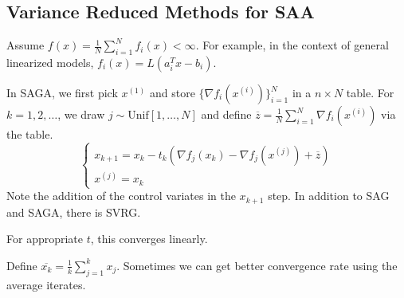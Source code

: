 \subsection{Variance Reduced Methods for SAA}
Assume $f(x) = \frac{1}{N} \sum_{i=1}^N f_i(x) < \infty$. For example, in the context of general linearized models, $f_i(x) = L(a_i^T x - b_i)$.

In SAGA, we first pick $x^{(1)}$ and store $\{ \nabla f_i(x^{(i)} ) \}_{i=1}^N$ in a $n \times N$ table. For $k=1,2,\dots$, we draw $j \sim \text{Unif}[1,\dots,N]$ and define $\overline{z} = \frac{1}{N} \sum_{i=1}^N \nabla f_i(x^{(i)})$ via the table.
\[
\begin{cases}
x_{k+1} = x_k - t_k (\nabla f_j(x_k) - \nabla f_j(x^{(j)}) + \overline{z} ) \\
x^{(j)} = x_k
\end{cases}
\]
Note the addition of the control variates in the $x_{k+1}$ step. In addition to SAG and SAGA, there is SVRG.
\begin{thrm}
For appropriate $t$, this converges linearly.
\end{thrm}

\begin{rem}
Define $\overline{x_k} = \frac{1}{k} \sum_{j=1}^k x_j$. Sometimes we can get better convergence rate using the average iterates.
\end{rem}
